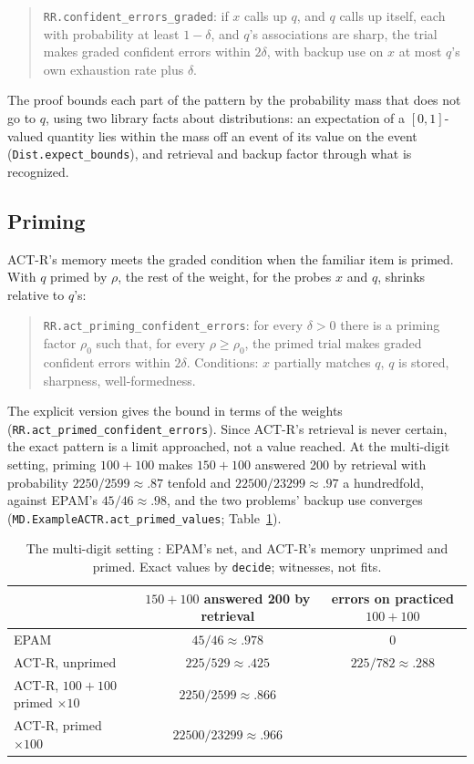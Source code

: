 \documentclass[11pt]{article}
\newcommand{\code}[1]{\texttt{#1}}
\newcommand{\lean}[1]{\texttt{#1}}
\begin{document}
\begin{quote}
\lean{RR.confident\_errors\_graded}: if $x$ calls up $q$, and $q$ calls up itself, each with probability at least $1-\delta$, and $q$'s associations are sharp, the trial makes graded confident errors within $2\delta$, with backup use on $x$ at most $q$'s own exhaustion rate plus $\delta$.
\end{quote}

The proof bounds each part of the pattern by the probability mass that does not go to $q$, using two library facts about distributions: an expectation of a $[0,1]$-valued quantity lies within the mass off an event of its value on the event (\lean{Dist.expect\_bounds}), and retrieval and backup factor through what is recognized.

\subsection{Priming}

ACT-R's memory meets the graded condition when the familiar item is primed. With $q$ primed by $\rho$, the rest of the weight, for the probes $x$ and $q$, shrinks relative to $q$'s:

\begin{quote}
\lean{RR.act\_priming\_confident\_errors}: for every $\delta > 0$ there is a priming factor $\rho_0$ such that, for every $\rho \ge \rho_0$, the primed trial makes graded confident errors within $2\delta$. Conditions: $x$ partially matches $q$, $q$ is stored, sharpness, well-formedness.
\end{quote}

The explicit version gives the bound in terms of the weights (\lean{RR.act\_primed\_confident\_errors}). Since ACT-R's retrieval is never certain, the exact pattern is a limit approached, not a value reached. At the multi-digit setting, priming $100+100$ makes $150+100$ answered 200 by retrieval with probability $2250/2599 \approx .87$ tenfold and $22500/23299 \approx .97$ a hundredfold, against EPAM's $45/46 \approx .98$, and the two problems' backup use converges (\lean{MD.ExampleACTR.act\_primed\_values}; Table~\ref{tab:primed}).

\begin{table}[t]
\centering\small
\begin{tabular}{lcc}
\toprule
& $150+100$ answered 200 by retrieval & errors on practiced $100+100$ \\
\midrule
EPAM & $45/46 \approx .978$ & 0 \\
ACT-R, unprimed & $225/529 \approx .425$ & $225/782 \approx .288$ \\
ACT-R, $100+100$ primed $\times 10$ & $2250/2599 \approx .866$ & \\
ACT-R, primed $\times 100$ & $22500/23299 \approx .966$ & \\
\bottomrule
\end{tabular}
\caption{The multi-digit setting \citep{shrager2026multidigit}: EPAM's net, and ACT-R's memory unprimed and primed. Exact values by \code{decide}; witnesses, not fits.}
\label{tab:primed}
\end{table}
\end{document}
